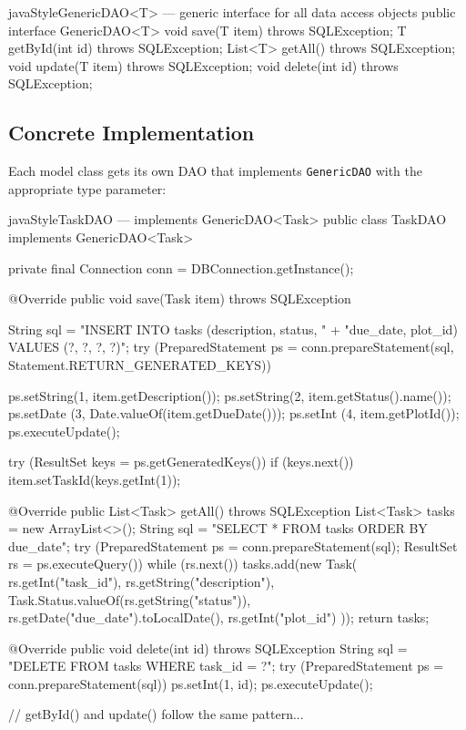 \documentclass[12pt, a4paper]{report}
\begin{document}
\begin{codeblock}{javaStyle}{GenericDAO<T> --- generic interface for all data access objects}
public interface GenericDAO<T> {
    void    save(T item)    throws SQLException;
    T       getById(int id) throws SQLException;
    List<T> getAll()        throws SQLException;
    void    update(T item)  throws SQLException;
    void    delete(int id)  throws SQLException;
}
\end{codeblock}

\subsection{Concrete Implementation}

Each model class gets its own DAO that implements \texttt{GenericDAO} with the appropriate type parameter:

\begin{codeblock}{javaStyle}{TaskDAO --- implements GenericDAO<Task>}
public class TaskDAO implements GenericDAO<Task> {
    private final Connection conn = DBConnection.getInstance();

    @Override
    public void save(Task item) throws SQLException {
        String sql = "INSERT INTO tasks (description, status, "
                   + "due_date, plot_id) VALUES (?, ?, ?, ?)";
        try (PreparedStatement ps = conn.prepareStatement(sql,
                Statement.RETURN_GENERATED_KEYS)) {
            ps.setString(1, item.getDescription());
            ps.setString(2, item.getStatus().name());
            ps.setDate  (3, Date.valueOf(item.getDueDate()));
            ps.setInt   (4, item.getPlotId());
            ps.executeUpdate();

            try (ResultSet keys = ps.getGeneratedKeys()) {
                if (keys.next())
                    item.setTaskId(keys.getInt(1));
            }
        }
    }

    @Override
    public List<Task> getAll() throws SQLException {
        List<Task> tasks = new ArrayList<>();
        String sql = "SELECT * FROM tasks ORDER BY due_date";
        try (PreparedStatement ps = conn.prepareStatement(sql);
             ResultSet rs = ps.executeQuery()) {
            while (rs.next()) {
                tasks.add(new Task(
                    rs.getInt("task_id"),
                    rs.getString("description"),
                    Task.Status.valueOf(rs.getString("status")),
                    rs.getDate("due_date").toLocalDate(),
                    rs.getInt("plot_id")
                ));
            }
        }
        return tasks;
    }

    @Override
    public void delete(int id) throws SQLException {
        String sql = "DELETE FROM tasks WHERE task_id = ?";
        try (PreparedStatement ps = conn.prepareStatement(sql)) {
            ps.setInt(1, id);
            ps.executeUpdate();
        }
    }

    // getById() and update() follow the same pattern...
}
\end{codeblock}
\end{document}
